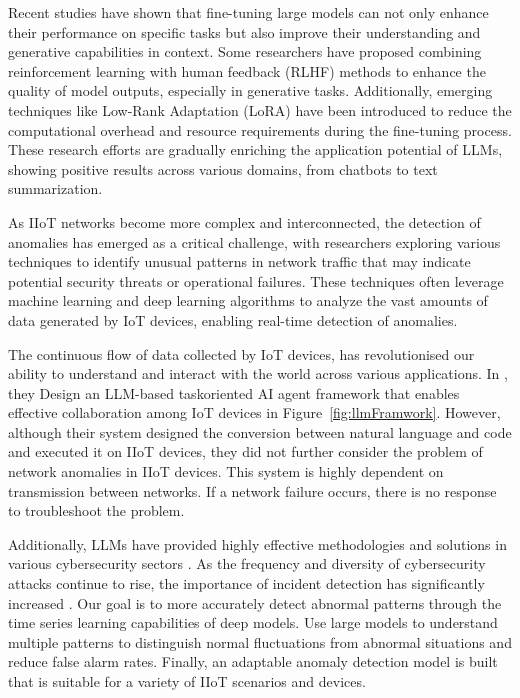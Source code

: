 \documentclass[usenatbib]{tjaa}
\begin{document}
Recent studies have shown that fine-tuning large models
can not only enhance their performance on specific tasks
but also improve their understanding and generative capabilities
in context\citep{ding2023parameter}.
Some researchers have proposed combining reinforcement
learning with human feedback (RLHF) methods to enhance
the quality of model outputs, especially in generative
tasks\citep{wu2023fine}.
Additionally, emerging techniques like Low-Rank Adaptation (LoRA)
have been introduced to reduce the computational overhead
and resource requirements during the fine-tuning process.
These research efforts are gradually enriching the application
potential of LLMs, showing positive results across various domains,
from chatbots to text summarization.

As IIoT networks become more complex and interconnected, the detection of anomalies
has emerged as a critical challenge, with researchers exploring
various techniques to identify unusual patterns in network traffic
that may indicate potential security threats or operational failures\citep{Reuer_2022}.
These techniques often leverage machine learning and deep learning algorithms
to analyze the vast amounts of data generated by IoT devices,
enabling real-time detection of anomalies\citep{alharbi2022novel}.

The continuous flow of data collected by IoT devices, has revolutionised
our ability to understand and interact with the world across various applications\citep{shirali2024llm}.
In \citet{cui2024llmind}, they Design an LLM-based taskoriented AI agent framework that enables effective collaboration
among IoT devices in Figure~\ref{fig:llmFramwork}\citep{cui2024llmind}.
However, although their system designed the conversion between natural
language and code and executed it on IIoT devices,
they did not further consider the problem of network anomalies in IIoT devices.
This system is highly dependent on transmission between networks.
If a network failure occurs, there is no response to troubleshoot the problem.

Additionally, LLMs have provided highly effective methodologies and solutions
in various cybersecurity sectors \citep{mohamed2024efficient}.
As the frequency and diversity of cybersecurity attacks continue to rise, the
importance of incident detection has significantly increased \citep{thandi2024revolutionizing}.
Our goal is to more accurately detect abnormal patterns through the time series learning capabilities
of deep models. Use large models to understand multiple patterns to distinguish normal fluctuations from
abnormal situations and reduce false alarm rates.
Finally, an adaptable anomaly detection model is built that is suitable for a variety of IIoT scenarios and devices.
\end{document}
